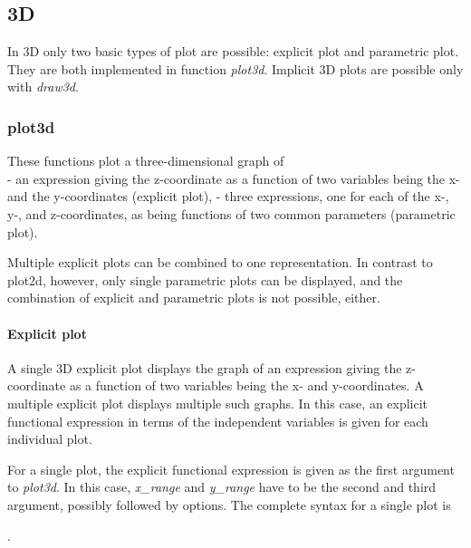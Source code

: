 \documentclass[../Maxima_Workbook.tex]{subfiles}
\begin{document}
\subsection{3D}

In 3D only two basic types of plot are possible: explicit plot and parametric plot. They are both implemented in function \emph{plot3d}. Implicit 3D plots are possible only with \emph{draw3d}.

\subsubsection{plot3d}

\lz {} \hfill \tcr{[function]}

 \hfill \tcr{[function]}

\lz These functions plot a three-dimensional graph of \\
- an expression giving the z-coordinate as a function of two variables being the x- and the y-coordinates (explicit plot),
- three expressions, one for each of the x-, y-, and z-coordinates, as being functions of two common parameters (parametric plot). 

\lz Multiple explicit plots can be combined to one representation. In contrast to plot2d, however, only single parametric plots can be displayed, and the combination of explicit and parametric plots is not possible, either.

\paragraph{Explicit plot} \mbox{}

\lz A single 3D explicit plot displays the graph of an expression giving the z-coordinate as a function of two variables being the x- and y-coordinates. A multiple explicit plot displays multiple such graphs. In this case, an explicit functional expression in terms of the independent variables is given for each individual plot.

\lz For a single plot, the explicit functional expression is given as the first argument to \emph{plot3d}. In this case, \emph{x\_range} and \emph{y\_range} have to be the second and third argument, possibly followed by options. The complete syntax for a single plot is

\lz {}.
\end{document}
